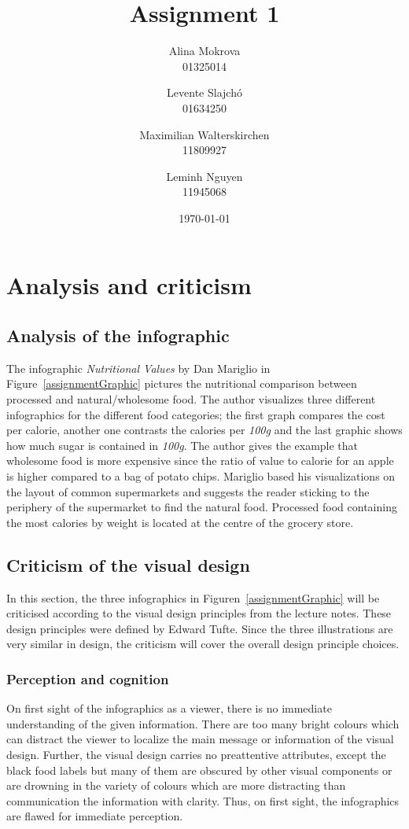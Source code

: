 \documentclass[a4paper, 11pt]{scrartcl}
\title{Assignment 1}
\author{Alina Mokrova\\
				01325014
				\and
				Levente	Slajchó\\
				01634250
				\and
				Maximilian Walterskirchen\\
				11809927
				\and
				Leminh Nguyen\\
				11945068}
\date{\today}
\begin{document}
\maketitle

\section{Analysis and criticism}

\subsection{Analysis of the infographic}

The infographic \textit{Nutritional Values} by Dan Mariglio in
Figure~\ref{assignmentGraphic} pictures the nutritional comparison between
processed and natural/wholesome food. The author visualizes three different
infographics for the different food categories; the first graph compares the
cost per calorie, another one contrasts the calories per \textit{100g} and the
last graphic shows how much sugar is contained in \textit{100g}. The author
gives the example that wholesome food is more expensive since the ratio of value
to calorie for an apple is higher compared to a bag of potato chips. Mariglio
based his visualizations on the layout of common supermarkets and suggests the
reader sticking to the periphery of the supermarket to find the natural food.
Processed food containing the most calories by weight is located at the centre
of the grocery store.

\subsection{Criticism of the visual design}

In this section, the three infographics in Figuren~\ref{assignmentGraphic} will
be criticised according to the visual design principles from the lecture notes.
These design principles were defined by Edward Tufte\cite{Tufte2001}. Since the
three illustrations are very similar in design, the criticism will cover the
overall design principle choices.

\subsubsection{Perception and cognition}


On first sight of the infographics as a viewer, there is no immediate
understanding of the given information. There are too many bright colours which
can distract the viewer to localize the main message or information of the
visual design. Further, the visual design carries no preattentive attributes,
except the black food labels but many of them are obscured by other visual
components or are drowning in the variety of colours which are more distracting
than communication the information with clarity.  Thus, on first sight, the
infographics are flawed for immediate perception.
\end{document}
